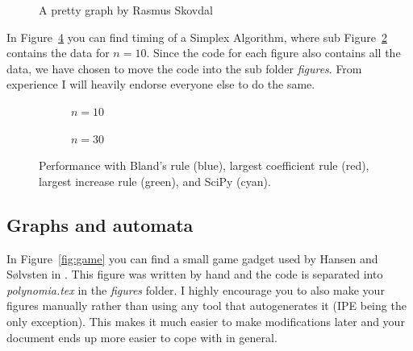 \documentclass[a4, english]{article}
\begin{document}
\begin{figure}[ht!]
  \centering


  \caption{A pretty graph by Rasmus Skovdal}
  \label{fig:calc_graph}
\end{figure}

In Figure~\ref{fig:simplex} you can find timing of a Simplex Algorithm, where
sub Figure~\ref{fig:simplex_10} contains the data for $n = 10$. Since the code
for each figure also contains all the data, we have chosen to move the code into
the sub folder \emph{figures}. From experience I will heavily endorse everyone
else to do the same.
\begin{figure}[ht!]
  \centering
  \begin{subfigure}{.48\linewidth}
    \centering
    
    \caption{$n = 10$}
    \label{fig:simplex_10}
  \end{subfigure}
  \begin{subfigure}{.48\linewidth}
    \centering
    
    \caption{$n = 30$}
    \label{fig:simplex_30}
  \end{subfigure}

  \caption{Performance with Bland's rule (blue), largest coefficient rule (red),
    largest increase rule (green), and SciPy (cyan).}
  \label{fig:simplex}
\end{figure}

\subsection{Graphs and automata}
In Figure~\ref{fig:game} you can find a small game gadget used by Hansen and
Sølvsten in \cite{ICALP:Hansen2020}. This figure was written by hand and the code is
separated into \emph{polynomia.tex} in the \emph{figures} folder. I highly
encourage you to also make your figures manually rather than using any tool that
autogenerates it (IPE being the only exception). This makes it much easier
to make modifications later and your document ends up more easier to cope with
in general.
\end{document}
